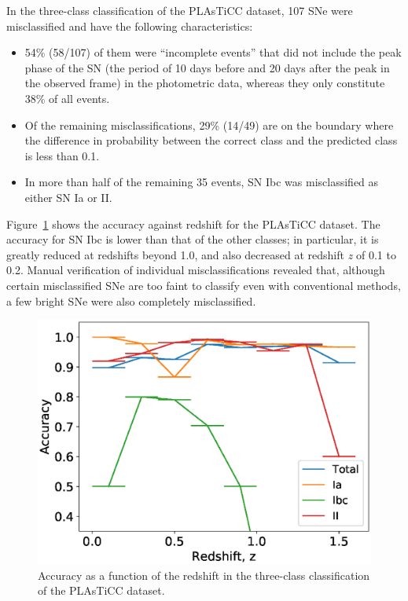 \documentclass[useamsfonts]{pasj01}
\begin{document}
%
In the three-class classification of the PLAsTiCC dataset,
107 SNe were misclassified and have the following characteristics:
\begin{itemize}
\item 54\% (58/107) of them  were ``incomplete events'' that did not include the peak phase of the SN (the period of 10 days before and 20 days after the peak in the observed frame) in the photometric data, whereas they only constitute 38\% of all events.
\item Of the remaining misclassifications, 29\% (14/49) are on the boundary where the difference in probability between the correct class and the predicted class is less than 0.1.
\item In more than half of the remaining 35 events, SN Ibc was misclassified as either SN Ia or II.
\end{itemize}
Figure\ \ref{fig:misclass_rate_3class} shows the accuracy against redshift for the PLAsTiCC dataset.
The accuracy for SN Ibc is lower than that of the other classes; in particular, it is greatly reduced at redshifts beyond 1.0, and also decreased at redshift {\it z} of 0.1 to 0.2.
Manual verification of individual misclassifications revealed that, although certain misclassified SNe are too faint to classify even with conventional methods, a few bright SNe were also completely misclassified.
%
\begin{figure}[htbp]
  \begin{center}
     \includegraphics[width=\columnwidth]{figures/misclass_rate_plastic_3class.eps}
  \end{center}
  \caption{%
  Accuracy as a function of the redshift in the three-class classification of the PLAsTiCC dataset.
  }%
  \label{fig:misclass_rate_3class}
\end{figure}
\end{document}
